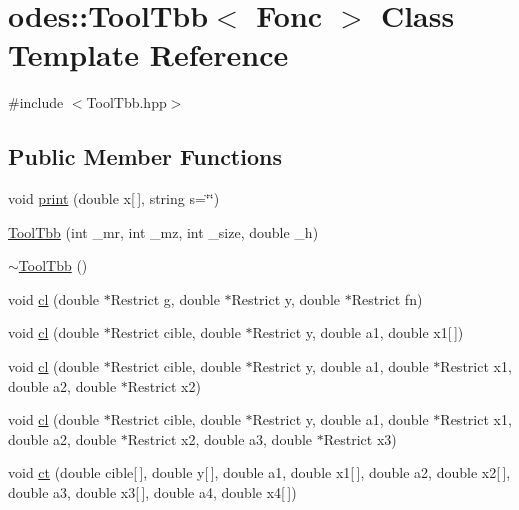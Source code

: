 \hypertarget{classodes_1_1ToolTbb}{\section{odes\-:\-:Tool\-Tbb$<$ Fonc $>$ Class Template Reference}
\label{classodes_1_1ToolTbb}
}


{\ttfamily \#include $<$Tool\-Tbb.\-hpp$>$}

\subsection*{Public Member Functions}
\begin{DoxyCompactItemize}
\item 
void \hyperlink{classodes_1_1ToolTbb_a36028d154efa3967589e6b3fce396944}{print} (double x\mbox{[}$\,$\mbox{]}, string s=\char`\"{}\char`\"{})
\item 
\hyperlink{classodes_1_1ToolTbb_a3a6a25aaa58669651fb208f4b1526973}{Tool\-Tbb} (int \-\_\-mr, int \-\_\-mz, int \-\_\-size, double \-\_\-h)
\item 
\hyperlink{classodes_1_1ToolTbb_a945ee5b4acc49c20aeeb2a2418ff3ae7}{$\sim$\-Tool\-Tbb} ()
\item 
void \hyperlink{classodes_1_1ToolTbb_ac9bb9fa0f00210f3b52d5e0d1a64ab68}{cl} (double $\ast$Restrict g, double $\ast$Restrict y, double $\ast$Restrict fn)
\item 
void \hyperlink{classodes_1_1ToolTbb_a1635342c236cbb5f0be07e732b4d1450}{cl} (double $\ast$Restrict cible, double $\ast$Restrict y, double a1, double x1\mbox{[}$\,$\mbox{]})
\item 
void \hyperlink{classodes_1_1ToolTbb_af142765718592c09ffb3b50fef46e540}{cl} (double $\ast$Restrict cible, double $\ast$Restrict y, double a1, double $\ast$Restrict x1, double a2, double $\ast$Restrict x2)
\item 
void \hyperlink{classodes_1_1ToolTbb_a3de2db9fe795de59cdf249b6ed480450}{cl} (double $\ast$Restrict cible, double $\ast$Restrict y, double a1, double $\ast$Restrict x1, double a2, double $\ast$Restrict x2, double a3, double $\ast$Restrict x3)
\item 
void \hyperlink{classodes_1_1ToolTbb_a5a60ee6890991b8c764f40706c2cb719}{ct} (double cible\mbox{[}$\,$\mbox{]}, double y\mbox{[}$\,$\mbox{]}, double a1, double x1\mbox{[}$\,$\mbox{]}, double a2, double x2\mbox{[}$\,$\mbox{]}, double a3, double x3\mbox{[}$\,$\mbox{]}, double a4, double x4\mbox{[}$\,$\mbox{]})
\item 

\end{DoxyCompactItemize}
